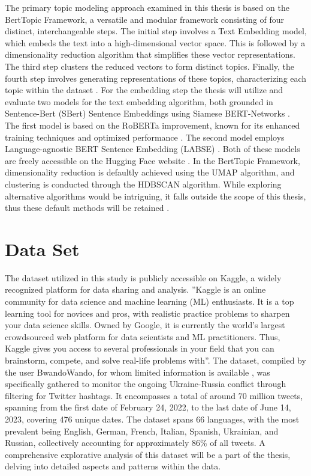 \documentclass[
    11pt,
    a4paper,
    egregdoesnotlikesansseriftitles,
    toc=chapterentrywithdots,
    oneside,openright,
    titlepage,
    parskip=half,
    headings=normal,  %
    listof=totoc,
    bibliography=totoc,
    index=totoc,
    captions=tableheading,  %
    chapterprefix,
    listof=flat,
    final
]{scrbook}
\begin{document}
The primary topic modeling approach examined in this thesis is based on the BertTopic Framework, a versatile and modular framework consisting of four distinct, interchangeable steps. The initial step involves a Text Embedding model, which embeds the text into a high-dimensional vector space. This is followed by a dimensionality reduction algorithm that simplifies these vector representations. The third step clusters the reduced vectors to form distinct topics. Finally, the fourth step involves generating representations of these topics, characterizing each topic within the dataset \cite{BERTopic}.
For the embedding step the thesis will utilize and evaluate two models for the text embedding algorithm, both grounded in Sentence-Bert (SBert) Sentence Embeddings using Siamese BERT-Networks \cite{SentenceBERT}. The first model is based on the RoBERTa improvement, known for its enhanced training techniques and optimized performance \cite{RoBERTa}. The second model employs Language-agnostic BERT Sentence Embedding (LABSE) \cite{Labse}. Both of these models are freely accessible on the Hugging Face website \cite{HuggingFace}.
In the BertTopic Framework, dimensionality reduction is defaultly achieved using the UMAP algorithm, and clustering is conducted through the HDBSCAN algorithm. While exploring alternative algorithms would be intriguing, it falls outside the scope of this thesis, thus these default methods will be retained \cite{UMAP,HDBSCAN}.

{\let\clearpage\relax \chapter{Data Set}}
The dataset utilized in this study is publicly accessible on Kaggle, a widely recognized platform for data sharing and analysis. ''Kaggle is an online community for data science and machine learning (ML) enthusiasts. It is a top learning tool for novices and pros, with realistic practice problems to sharpen your data science skills.
Owned by Google, it is currently the world’s largest crowdsourced web platform for data scientists and ML practitioners. Thus, Kaggle gives you access to several professionals in your field that you can brainstorm, compete, and solve real-life problems with''\cite{Kaggle}.
The dataset, compiled by the user BwandoWando, for whom limited information is available \cite{bwandowando}, was specifically gathered to monitor the ongoing Ukraine-Russia conflict through filtering for Twitter hashtags.
It encompasses a total of around 70 million tweets, spanning from the first date of February 24, 2022, to the last date of June 14, 2023, covering 476 unique dates. The dataset spans 66 languages, with the most prevalent being English, German, French, Italian, Spanish, Ukrainian, and Russian, collectively accounting for approximately 86\% of all tweets. A comprehensive explorative analysis of this dataset will be a part of the thesis, delving into detailed aspects and patterns within the data.
\end{document}
